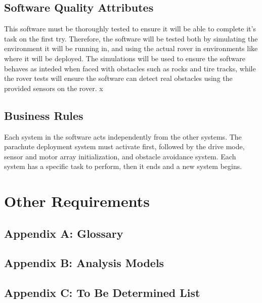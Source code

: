 \documentclass{scrreprt}
\begin{document}
\section{Software Quality Attributes}
This software must be thoroughly tested to ensure it will be able to complete it's task on the first try. Therefore, the software will be tested both by simulating the environment it will be running in, and using the actual rover in environments like where it will be deployed. The simulations will be used to ensure the software behaves as inteded when faced with obstacles such as rocks and tire tracks, while the rover tests will ensure the software can detect real obstacles using the provided sensors on the rover. x 

\section{Business Rules}
Each system in the software acts independently from the other systems. The parachute deployment system must activate first, followed by the drive mode, sensor and motor array initialization, and obstacle avoidance system. Each system has a specific task to perform, then it ends and a new system begins.


\chapter{Other Requirements}


\section{Appendix A: Glossary}


\section{Appendix B: Analysis Models}


\section{Appendix C: To Be Determined List}
\end{document}
